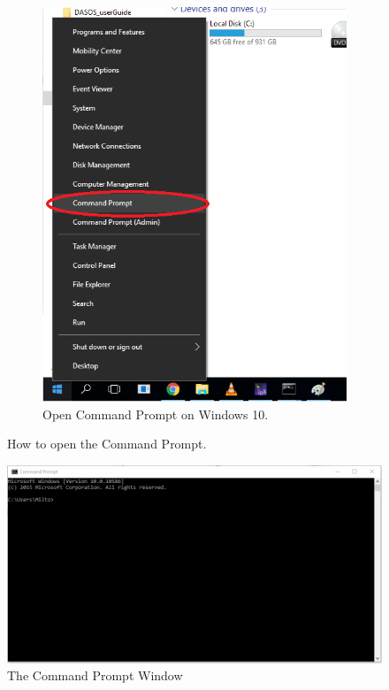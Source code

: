 \documentclass{article}
\begin{document}
{\begin{figure} [h!]
\begin{subfigure}[t]{.49\textwidth}
	 	 			\includegraphics[width=.9\textwidth]{findCommandPrompt.png}
	 	 			\caption{Open Command Prompt on Windows 10.}
	 	 			\label{fig:Windows10}
		 	 	 \end{subfigure} \hfill	 	 			
	 	 		\caption{How to open the Command Prompt.}
	 	 		\label{fig:OpenCommandPrompt} 
	 	 	\end{figure}
	 	 	
	 	 	\begin{figure}[!htbp]
	 	 		\includegraphics[width=\textwidth]{CommandPrompt.png}
	 	 		\caption{The Command Prompt Window}
	 	 		\label{fig:CommandPrompt}
	 	 	\end{figure}
	 	 }
	
\end{document}
